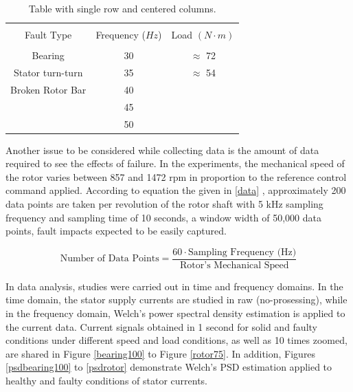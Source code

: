 \begin{table}[h]
	{\setlength{\tabcolsep}{12pt}
		\caption{Table with single row and centered columns.}
		\begin{center}
			\vspace{-6mm}
			\begin{tabular}{ccc}
				\hline \\[-2.45ex] \hline \\[-2.1ex]
				Fault Type & Frequency ($Hz$) & Load $(N\cdot m)$ \\
				\hline \\[-1.8ex]
				Bearing & 30 & $\approx$ 72  \\
				Stator turn-turn & 35 & $\approx$ 54  \\
				Broken Rotor Bar & 40 &  \\
				& 45 &   \\
				& 50 &   \\
				\hline
			\end{tabular}
			\vspace{-6mm}
		\end{center}
		\label{Table3.3}}
\end{table}

Another issue to be considered while collecting data is the amount of data required to see the effects of failure. In the experiments, the mechanical speed of the rotor varies between 857 and 1472 rpm in proportion to the reference control command applied. According to equation the given in \ref{data} \cite{shenfield2020novel}, approximately 200 data points are taken per revolution of the rotor shaft with 5 kHz sampling frequency and sampling time of 10 seconds, a window width of 50,000 data points, fault impacts expected to be easily captured.

\begin{equation}
	\text{Number of Data Points} = \displaystyle \frac{60 \cdot \text{Sampling Frequency (Hz)}}{\text{Rotor's Mechanical Speed}}
	\label{data}
\end{equation}

In data analysis, studies were carried out in time and frequency domains. In the time domain, the stator supply currents are studied in raw (no-prosessing), while in the frequency domain, Welch's power spectral density estimation is applied to the current data. Current signals obtained in 1 second for solid and faulty conditions under different speed and load conditions, as well as 10 times zoomed, are shared in Figure \ref{bearing100} to Figure \ref{rotor75}. In addition, Figures \ref{psdbearing100} to \ref{psdrotor} demonstrate Welch's PSD estimation applied to healthy and faulty conditions of stator currents.

